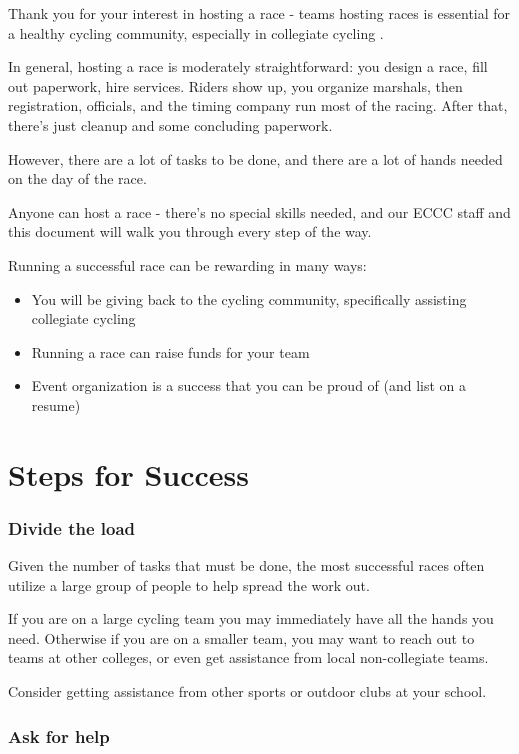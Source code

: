 \documentclass[
  letterpaper, %
  fontsize=10pt, %
  twoside=true,
  chapterentrydots=true, %
  numbers=noenddot,
  fontmethod=tex,
]{kaobook}
\begin{document}
Thank you for your interest in hosting a race -
teams hosting races is essential for a healthy cycling community,
especially in collegiate cycling%
.

In general, hosting a race is moderately straightforward:
you design a race, fill out paperwork, hire services.
Riders show up, you organize marshals, then registration, officials,
and the timing company run most of the racing.
After that, there's just cleanup and some concluding paperwork.

However, there are a lot of tasks to be done,
and there are a lot of hands needed on the day of the race.

Anyone can host a race - there's no special skills needed,
and our ECCC staff and this document will walk you through every step of the way.

Running a successful race can be rewarding in many ways:
\begin{itemize}
  \item You will be giving back to the cycling community,
        specifically assisting collegiate cycling
  \item Running a race can raise funds for your team
  \item Event organization is a success that you can be proud of (and list on a resume)
\end{itemize}

\section{Steps for Success}

\subsubsection{Divide the load}
Given the number of tasks that must be done, the most successful races often
utilize a large group of people to help spread the work out.

If you are on a large cycling team you may immediately have all the hands you need.
Otherwise if you are on a smaller team, you may want to reach out to teams at other colleges, or even get assistance from local non-collegiate teams.

Consider getting assistance from other sports or outdoor clubs at your school.

\subsubsection{Ask for help}
\end{document}
